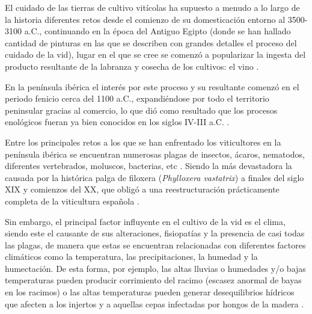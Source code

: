 El cuidado de las tierras de cultivo vitícolas ha supuesto a menudo a lo largo 
de la historia diferentes retos desde el comienzo de su domesticación entorno al 
3500-3100 a.C., continuando en la época del Antiguo Egipto (donde se han hallado 
cantidad de pinturas en las que se describen con grandes detalles el proceso
del cuidado de la vid), lugar en el que se cree se comenzó a popularizar la ingesta
del producto resultante de la labranza y cosecha de los cultivos: el vino \cite{book:piqueras2014}.

En la península ibérica el interés por este proceso y su resultante comenzó en el 
periodo fenicio cerca del 1100 a.C., expandiéndose por todo el territorio peninsular
gracias al comercio, lo que dió como resultado que los procesos enológicos fueran ya bien
conocidos en los siglos IV-III a.C. \cite{book:piqueras2014, MAPA:Historia}.

Entre los principales retos a los que se han enfrentado los viticultores en la península ibérica se 
encuentran numerosas plagas de insectos, ácaros, nematodos, diferentes vertebrados, moluscos, bacterias, etc \cite{book:mundi2004}.
Siendo la más devastadora la causada por la histórica palga de filoxera (\textit{Phylloxera vastatrix}) a 
finales del siglo XIX y comienzos del XX, que obligó a una reestructuración prácticamente completa de la viticultura española \cite{book:mundi2004}.

Sin embargo, el principal factor influyente en el cultivo de la vid es el clima, siendo este el causante de sus alteraciones, fisiopatías y
la presencia de casi todas las plagas, de manera que estas se encuentran relacionadas con diferentes 
factores climáticos como la temperatura, las precipitaciones, la humedad y la humectación. 
De esta forma, por ejemplo, las altas lluvias o humedades y/o bajas temperaturas pueden producir corrimiento del racimo (escasez anormal de bayas en los racimos) o 
las altas temperaturas pueden generar desequilibrios hídricos que afecten a los injertos y a aquellas cepas infectadas por hongos de la madera \cite{book:mundi2004}.

